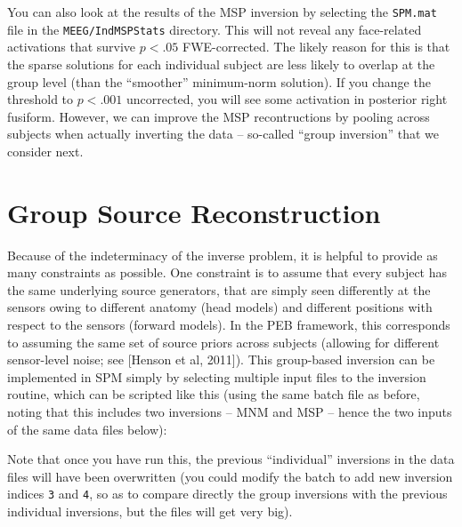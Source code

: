 You can also look at the results of the MSP inversion by selecting the \texttt{SPM.mat} file in the \texttt{MEEG/IndMSPStats} directory. This will not reveal any face-related activations that survive \(p<.05\) FWE-corrected. The likely reason for this is that the sparse solutions for each individual subject are less likely to overlap at the group level (than the ``smoother'' minimum-norm solution). If you change the threshold to \(p<.001\) uncorrected, you will see some activation in posterior right fusiform. However, we can improve the MSP recontructions by pooling across subjects when actually inverting the data -- so-called ``group inversion'' that we consider next.

\section{Group Source Reconstruction}

Because of the indeterminacy of the inverse problem, it is helpful to provide as many constraints as possible. One constraint is to assume that every subject has the same underlying source generators, that are simply seen differently at the sensors owing to different anatomy (head models) and different positions with respect to the sensors (forward models). In the PEB framework, this corresponds to assuming the same set of source priors across subjects (allowing for different sensor-level noise; see [Henson et al, 2011]). This group-based inversion can be implemented in SPM simply by selecting multiple input files to the inversion routine, which can be scripted like this (using the same batch file as before, noting that this includes two inversions -- MNM and MSP -- hence the two inputs of the same data files below):


Note that once you have run this, the previous ``individual'' inversions in the data files will have been overwritten (you could modify the batch to add new inversion indices \texttt{3} and \texttt{4}, so as to compare directly the group inversions with the previous individual inversions, but the files will get very big).

